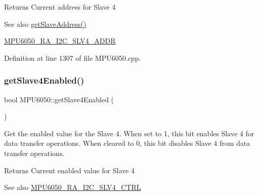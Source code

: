 \begin{DoxyReturn}{Returns}
Current address for Slave 4 
\end{DoxyReturn}
\begin{DoxySeeAlso}{See also}
\mbox{\hyperlink{classMPU6050_af75b9f7ccac48515c7544238db0e6863}{get\+Slave\+Address()}} 

\mbox{\hyperlink{MPU6050_8h_a3a3a4854870a5f354e50fbc4eae196c0}{M\+P\+U6050\+\_\+\+R\+A\+\_\+\+I2\+C\+\_\+\+S\+L\+V4\+\_\+\+A\+D\+DR}} 
\end{DoxySeeAlso}


Definition at line 1307 of file M\+P\+U6050.\+cpp.


\begin{DoxyCode}{0}

\end{DoxyCode}
\mbox{\label{classMPU6050_a4b9e13d6776ba99e042773873557bedd}} 
\subsubsection{\texorpdfstring{getSlave4Enabled()}{getSlave4Enabled()}}
{\footnotesize\ttfamily bool M\+P\+U6050\+::get\+Slave4\+Enabled (\begin{DoxyParamCaption}{ }\end{DoxyParamCaption})}

Get the enabled value for the Slave 4. When set to 1, this bit enables Slave 4 for data transfer operations. When cleared to 0, this bit disables Slave 4 from data transfer operations. \begin{DoxyReturn}{Returns}
Current enabled value for Slave 4 
\end{DoxyReturn}
\begin{DoxySeeAlso}{See also}
\mbox{\hyperlink{MPU6050_8h_a2b6fbfceb145ba1c8b19f51475fd7a5d}{M\+P\+U6050\+\_\+\+R\+A\+\_\+\+I2\+C\+\_\+\+S\+L\+V4\+\_\+\+C\+T\+RL}} 
\end{DoxySeeAlso}


